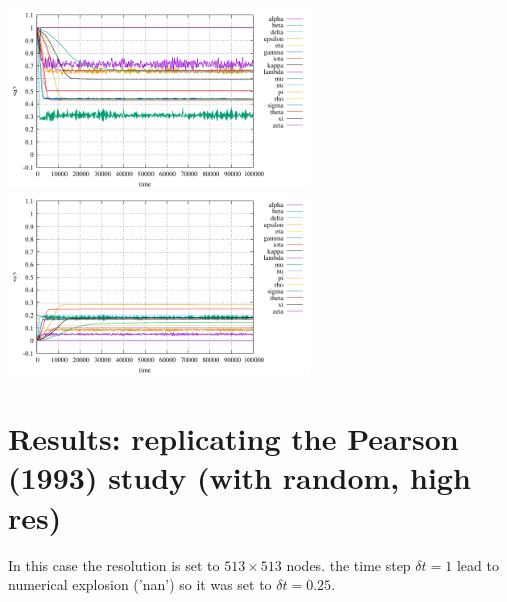 \includegraphics[width=8cm]{python_codes/fieldstone_171/pearson93_rand/stats_u.pdf}
\includegraphics[width=8cm]{python_codes/fieldstone_171/pearson93_rand/stats_v.pdf}

\newpage
\section*{Results: replicating the Pearson (1993) study (with random, high res)}

In this case the resolution is set to $513\times 513$ nodes.
the time step $\delta t=1$ lead to numerical explosion ('nan') so 
it was set to $\delta t=0.25$.


